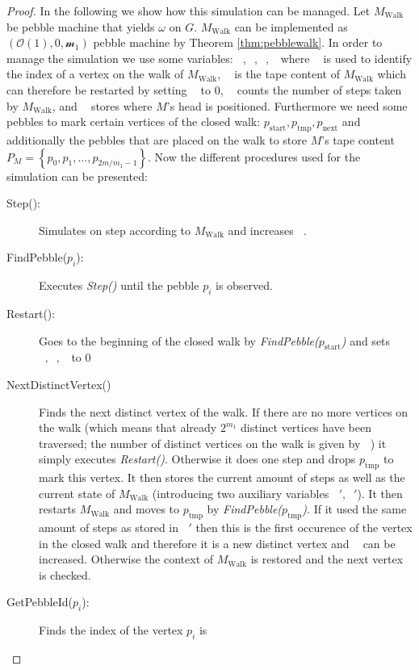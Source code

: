 \documentclass[draft,oneside]{scrartcl}
\DeclareMathOperator{\Tid}{T_{\text{id}}}
\DeclareMathOperator{\Tsteps}{T_{\text{steps}}}
\DeclareMathOperator{\Twalk}{T_{\text{walk}}}
\DeclareMathOperator{\Thead}{T_{\text{head}}}
\begin{document}
\begin{proof}
  In the following we show how this simulation can be managed.
  Let $M_{\text{Walk}}$ be pebble machine that yields $\omega$ on $G$.
  $M_{\text{Walk}}$ can be implemented as $(\mathcal{O}(1),0,\mathcal{m_1})$
  pebble machine by Theorem \ref{thm:pebblewalk}.
  In order to manage the simulation we use some
  variables: $\Tid, \Tsteps, \Twalk, \Thead$ where $\Tid$ is used to identify
  the index of a vertex on the walk of $M_{\text{Walk}}$, $\Twalk$ is the tape
  content of $M_{\text{Walk}}$ which can therefore be restarted by setting
  $\Twalk$ to 0, $\Tsteps$ counts the number of steps taken by
  $M_{\text{Walk}}$, and $\Thead$ stores where $M$'s head is positioned.
  Furthermore we need some pebbles to mark certain vertices of the closed walk:
  $p_{\text{start}}, p_{\text{tmp}}, p_{\text{next}}$ and additionally the
  pebbles that are placed on the walk to store $M$'s tape content
  $P_{M} = \left\{p_{0},p_{1},\dots,p_{2m/m_{1}-1}\right\}$.
  Now the different procedures used for the simulation can be presented:
  \begin{description}
    \item[Step():] Simulates on step according to $M_{\text{Walk}}$ and
      increases $\Tsteps$.
    \item[FindPebble($p_{i}$):] Executes \emph{Step()} until the pebble $p_{i}$
      is observed.
    \item[Restart():] Goes to the beginning of the closed walk by
      \emph{FindPebble($p_{\text{start}}$)} and sets $\Tsteps,\Tid,\Twalk$ to 0
    \item[NextDistinctVertex()] Finds the next distinct vertex of the walk. If
      there are no more vertices on the walk (which means that already
      $2^{m_1}$ distinct vertices have been traversed; the number of distinct
      vertices on the walk is given by $\Tid$) it simply executes
      \emph{Restart()}. Otherwise it does one step and drops $p_{\text{tmp}}$
      to mark this vertex. It then stores the current amount of steps as well
      as the current state of $M_{\text{Walk}}$ (introducing two auxiliary
      variables $\Tsteps',\Twalk'$). It then restarts $M_{\text{Walk}}$ and
      moves to $p_{\text{tmp}}$ by \emph{FindPebble($p_{\text{tmp}}$)}. If
      it used the same amount of steps as stored in $\Tsteps'$ then this is the
      first occurence of the vertex in the closed walk and therefore it is a
      new distinct vertex and $\Tid$ can be increased. Otherwise the context of
      $M_{\text{Walk}}$ is restored and the next vertex is checked.
    \item[GetPebbleId($p_{i}$):] Finds the index of the vertex $p_{i}$ is

\end{description}
\end{proof}
\end{document}
